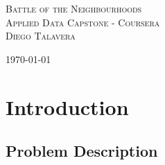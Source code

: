 \documentclass{article}
\begin{document}
	
	\begin{titlepage}
		\center
		\newcommand{\HRule}{\rule{\linewidth}{0.5mm}}
			\textsc{\Huge Battle of the Neighbourhoods}\\[1.5cm]
			\textsc{\LARGE Applied Data Capstone - Coursera}\\[0.3cm]
			\textsc{\large Diego Talavera}\\[0.5cm]
		
			\vfill\vfill\vfill %
			
			{\large\today} %
	\end{titlepage}
	
	
	\newpage				%
	\renewcommand{\contentsname}{Table of Contents}
	\tableofcontents		%
	
	
	\newpage
	\section{Introduction}
	\subsection{Problem Description}
	
	
	
	
	
	
	
	
	
	
	
	
	
\end{document}
